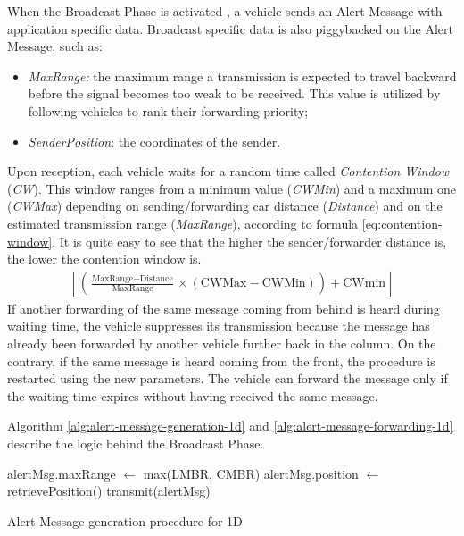 		
		When the Broadcast Phase is activated , a vehicle sends an Alert Message with application specific data. Broadcast specific data is also piggybacked on the Alert Message, such as:
		\begin{itemize}
			\item \textit{MaxRange:} the maximum range a transmission is expected to travel backward before the signal becomes too weak to be received. This value is utilized by following vehicles to rank their forwarding priority;
			\item \textit{SenderPosition}: the coordinates of the sender.
		\end{itemize}
		Upon reception, each vehicle waits for a random time called \textit{Contention Window} (\textit{CW}). This window ranges from a minimum value (\textit{CWMin}) and a maximum one (\textit{CWMax}) depending on sending/forwarding car distance (\textit{Distance}) and on the estimated transmission range (\textit{MaxRange}), according to formula \ref{eq:contention-window}. It is quite easy to see that the higher the sender/forwarder distance is, the lower the contention window is.
		\begin{gather}
			\left\lfloor \left( \frac{\text{MaxRange} - \text{Distance}}{\text{MaxRange}} \times (\text{CWMax} - \text{CWMin}) \right) + \text{CWmin}  \right\rfloor
			\label{eq:contention-window}
		\end{gather}
		If another forwarding of the same message coming from behind is heard during waiting time, the vehicle suppresses its transmission because the message has already been forwarded by another vehicle further back in the column. On the contrary, if the same message is heard coming from the front, the procedure is restarted using the new parameters. The vehicle can forward the message only if the waiting time expires without having received the same message.
		
		Algorithm \ref{alg:alert-message-generation-1d} and \ref{alg:alert-message-forwarding-1d} describe the logic behind the Broadcast Phase.
		
		\begin{algorithm}[H]
			\begin{algorithmic}[1]
				\State alertMsg.maxRange $\gets$ max(LMBR, CMBR)
				\State alertMsg.position $\gets$ retrievePosition()
				\State transmit(alertMsg)
			\end{algorithmic}
			\caption{Alert Message generation procedure for 1D}
			\label{alg:alert-message-generation-1d}
		\end{algorithm}
	
